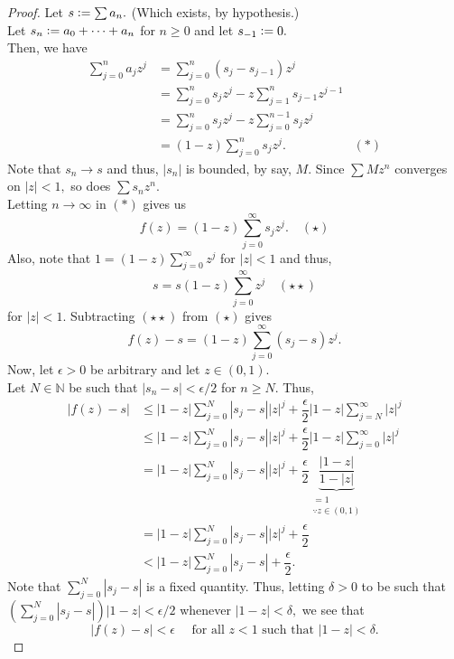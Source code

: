 \abellim*\label{thm:abellim2}
\begin{flushright}\hyperref[thm:abellim]{\upsym}\end{flushright}
\begin{proof}
	Let $s \vcentcolon= \sum a_n.$ (Which exists, by hypothesis.)\\
	Let $s_n \vcentcolon= a_0 + \cdots + a_n$ for $n \ge 0$ and let $s_{-1} \vcentcolon= 0.$\\
	Then, we have
	\begin{align*} 
		\sum_{j=0}^{n}a_jz^j &= \sum_{j=0}^{n}(s_j - s_{j-1})z^j\\
		&= \sum_{j=0}^{n}s_jz^j - z\sum_{j=1}^{n}s_{j-1}z^{j-1}\\
		&= \sum_{j=0}^{n}s_jz^j - z\sum_{j=0}^{n-1}s_{j}z^{j}\\
		&= (1 - z)\sum_{j=0}^{n}s_jz^j. & (*)
	\end{align*}
	Note that $s_n \to s$ and thus, $|s_n|$ is bounded, by say, $M.$ Since $\sum Mz^n$ converges on $|z| < 1,$ so does $\sum s_nz^n.$\\
	Letting $n\to \infty$ in $(*)$ gives us
	\begin{equation*} 
	 	f(z) = (1 - z)\sum_{j=0}^{\infty}s_jz^j.\quad(\star)
	\end{equation*}
	Also, note that $1 = (1 - z)\sum_{j=0}^{\infty}z^j$ for $|z| < 1$ and thus,
	\begin{equation*} 
		s = s(1 - z)\sum_{j=0}^{\infty}z^j \quad (\star\star)
	\end{equation*}
	for $|z| < 1.$ Subtracting $(\star\star)$ from $(\star)$ gives
	\begin{equation*} 
		f(z) - s = (1 - z)\sum_{j=0}^{\infty}(s_j - s)z^j.
	\end{equation*}
	Now, let $\epsilon > 0$ be arbitrary and let $z \in (0, 1).$\\
	Let $N \in \mathbb{N}$ be such that $|s_n - s| < \epsilon/2$ for $n \ge N.$ Thus,
	\begin{align*} 
		|f(z) - s| &\le |1-z|\sum_{j=0}^{N}|s_j - s||z|^j + \dfrac{\epsilon}{2}|1-z|\sum_{j=N}^{\infty}|z|^j\\
		&\le|1 - z|\sum_{j=0}^{N}|s_j - s||z|^j + \dfrac{\epsilon}{2}|1-z|\sum_{j=0}^{\infty}|z|^j\\
		&= |1 - z|\sum_{j=0}^{N}|s_j - s||z|^j + \dfrac{\epsilon}{2}\underbrace{\dfrac{|1-z|}{1-|z|}}_{\substack{=1 \\ \because z \in (0, 1)}}\\
		&= |1 - z|\sum_{j=0}^{N}|s_j - s||z|^j + \dfrac{\epsilon}{2}\\
		&< |1 - z|\sum_{j=0}^{N}|s_j - s| + \dfrac{\epsilon}{2}.
	\end{align*}
	Note that $\displaystyle\sum_{j=0}^{N}|s_j - s|$ is a fixed quantity. Thus, letting $\delta > 0$ to be such that $\left(\displaystyle\sum_{j=0}^{N}|s_j - s|\right)|1-z|<\epsilon/2$ whenever $|1 - z| < \delta,$ we see that
	\begin{equation*} 
		|f(z) - s| < \epsilon \quad \text{ for all } z < 1\text{ such that } |1 - z| < \delta.
	\end{equation*}	
\end{proof}


